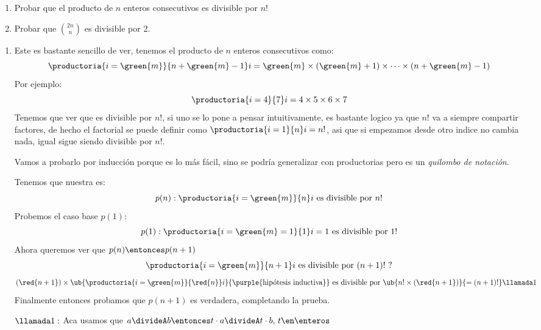 \begin{enunciado}{\ejercicio}
  \begin{enumerate}[label=\alph*)]
    \item Probar que el producto de $n$ enteros consecutivos es divisible por $n!$
    \item Probar que $\binom{2n}{n}$ es divisible por 2.
  \end{enumerate}
\end{enunciado}

\begin{enumerate}[label=\alph*)]
  \item
        Este es bastante sencillo de ver, tenemos el producto de $n$ enteros consecutivos como:
        $$
          \productoria{i=\green{m}}{n + \green{m} - 1} i = \green{m} \times (\green{m} + 1) \times \cdots \times (n + \green{m} - 1)
        $$
        Por ejemplo:
        $$
          \productoria{i=4}{7} i  = 4\times5\times6\times7
        $$
        Tenemos que ver que es divisible por $n!$, si uno se lo pone a pensar intuitivamente, es bastante logico
        ya que $n!$ va a siempre compartir factores, de hecho el factorial se puede definir como $\productoria{i=1}{n}  i = n!$, asi que
        si empezamos desde otro indice no cambia nada, igual sigue siendo divisible por $n!$.

        Vamos a probarlo por inducción porque es lo más fácil, sino se podría generalizar con productorias pero es un \textit{quilombo de notación}.

        Tenemos que nuestra  es:
        $$
          p(n):\productoria{i=\green{m}}{n} i \text{ es divisible por } n!
        $$
        Probemos el caso base $p(1)$:
        $$
          p(1): \productoria{i=\green{m}=1}{1}  i = 1 \text{ es divisible por 1!}
        $$
        Ahora queremos ver que $p(n) \entonces p(n+1)$
        $$
          \productoria{i=\green{m}}{n+1}  i \text { es divisible por $(n+1)!$ ?}
        $$
        $$
          (\red{n+1})  \times \ub{\displaystyle \productoria{i=\green{m}}{\red{n}}  i}{\text{\purple{hipótesis inductiva}}}
          \text{ es divisible por }
          \ub{n! \times (\red{n+1})}{=(n+1)!} \llamada1
        $$
        Finalmente entonces probamos que $p(n+1)$ es verdadera, completando la prueba.

        $\llamada1 :$ Aca usamos que
        $
          a\divideA b
          \entonces
          t\cdot a \divideA t \cdot b,\, t \en \enteros
        $


\end{enumerate}
